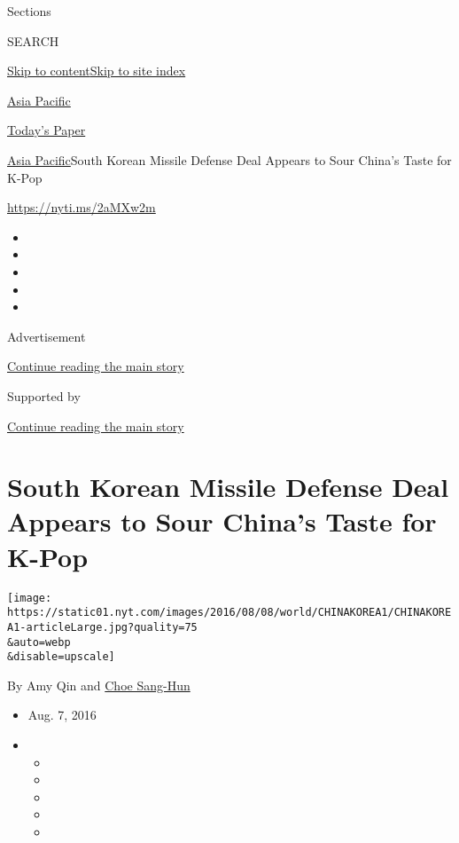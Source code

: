 Sections

SEARCH

\protect\hyperlink{site-content}{Skip to
content}\protect\hyperlink{site-index}{Skip to site index}

\href{https://www.nytimes.com/section/world/asia}{Asia Pacific}

\href{https://myaccount.nytimes.com/auth/login?response_type=cookie\&client_id=vi}{}

\href{https://www.nytimes.com/section/todayspaper}{Today's Paper}

\href{/section/world/asia}{Asia Pacific}\textbar{}South Korean Missile
Defense Deal Appears to Sour China's Taste for K-Pop

\url{https://nyti.ms/2aMXw2m}

\begin{itemize}
\item
\item
\item
\item
\item
\end{itemize}

Advertisement

\protect\hyperlink{after-top}{Continue reading the main story}

Supported by

\protect\hyperlink{after-sponsor}{Continue reading the main story}

\hypertarget{south-korean-missile-defense-deal-appears-to-sour-chinas-taste-for-k-pop}{%
\section{South Korean Missile Defense Deal Appears to Sour China's Taste
for
K-Pop}\label{south-korean-missile-defense-deal-appears-to-sour-chinas-taste-for-k-pop}}

\texttt{[image: https://static01.nyt.com/images/2016/08/08/world/CHINAKOREA1/CHINAKOREA1-articleLarge.jpg?quality=75\\\&auto=webp\\\&disable=upscale]}

By Amy Qin and \href{http://www.nytimes.com/by/choe-sang-hun}{Choe
Sang-Hun}

\begin{itemize}
\item
  Aug. 7, 2016
\item
  \begin{itemize}
  \item
  \item
  \item
  \item
  \item
  \end{itemize}
\end{itemize}

